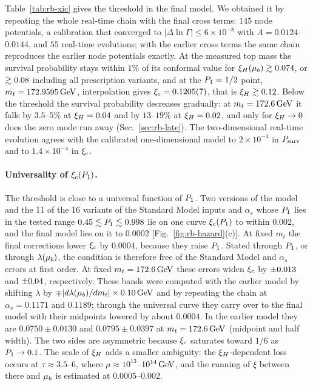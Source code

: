 Table~\ref{tab:rb-xic} gives the threshold in the final model. %
We obtained it by repeating the whole real-time chain with the final cross terms: $145$ node potentials, a calibration that converged to $|\Delta\ln\Gamma|\le6\times10^{-8}$ with $A=0.0124$--$0.0144$, and $55$ real-time evolutions; with the earlier cross terms the same chain reproduces the earlier node potentials exactly. %
At the measured top mass the survival probability stays within $1\%$ of its conformal value for $\xi_H(\mu_b)\gtrsim0.074$, or $\gtrsim0.08$ including all prescription variants, and at the $P_1=1/2$ point, $m_t=172.9595\,\mathrm{GeV}$, interpolation gives $\xi_c=0.1205(7)$, that is $\xi_H\gtrsim0.12$. %
Below the threshold the survival probability decreases gradually: at $m_t=172.6\,\mathrm{GeV}$ it falls by $3.5$--$5\%$ at $\xi_H=0.04$ and by $13$--$19\%$ at $\xi_H=0.02$, and only for $\xi_H\to0$ does the zero mode run away (Sec.~\ref{sec:rb-late}). %
The two-dimensional real-time evolution agrees with the calibrated one-dimensional model to $2\times10^{-4}$ in $P_{\rm surv}$ and to $1.4\times10^{-4}$ in $\xi_c$. %

\paragraph{Universality of $\xi_c(P_1)$.}
The threshold is close to a universal function of $P_1$.
Two versions of the model and the 11 of the 16 variants of the Standard Model inputs and $\alpha_s$ whose $P_1$ lies in the tested range $0.45\lesssim P_1\lesssim0.998$ lie on one curve $\xi_c(P_1)$ to within $0.002$, and the final model lies on it to $0.0002$ [Fig.~\ref{fig:rb-hazard}(c)]. %
At fixed $m_t$ the final corrections lower $\xi_c$ by $0.0004$, because they raise $P_1$. %
Stated through $P_1$, or through $\lambda(\mu_b)$, the condition is therefore free of the Standard Model and $\alpha_s$ errors at first order.
At fixed $m_t=172.6\,\mathrm{GeV}$ these errors widen $\xi_c$ by $\pm0.013$ and $\pm0.04$, respectively. %
These bands were computed with the earlier model by shifting $\lambda$ by $\mp|d\lambda(\mu_b)/dm_t|\times0.10\,\mathrm{GeV}$ and by repeating the chain at $\alpha_s=0.1171$ and $0.1189$; through the universal curve they carry over to the final model with their midpoints lowered by about $0.0004$. %
In the earlier model they are $0.0750\pm0.0130$ and $0.0795\pm0.0397$ at $m_t=172.6\,\mathrm{GeV}$ (midpoint and half width). %
The two sides are asymmetric because $\xi_c$ saturates toward $1/6$ as $P_1\to0.1$.
The scale of $\xi_H$ adds a smaller ambiguity: the $\xi_H$-dependent loss occurs at $\tau\approx3.5$--$6$, where $\mu\approx10^{13}$--$10^{14}\,\mathrm{GeV}$, and the running of $\xi$ between there and $\mu_b$ is estimated at $0.0005$--$0.002$. %

